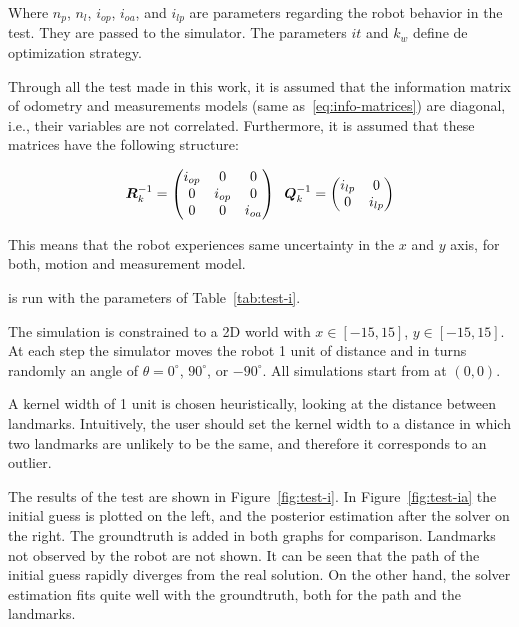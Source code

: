 Where $n_p$, $n_l$, $i_{op}$, $i_{oa}$, and $i_{lp}$ are parameters regarding the robot behavior in the test. They are passed to the simulator. The parameters $it$ and $k_w$ define de optimization strategy.

Through all the test made in this work, it is assumed that the information matrix of odometry and measurements models (same as~\eqref{eq:info-matrices}) are diagonal, i.e., their variables are not correlated. Furthermore, it is assumed that these matrices have the following structure:

\begin{equation}
\boldsymbol{R}^{-1}_k = \begin{pmatrix}
i_{op} & 0 & 0\\
0 & i_{op} & 0\\
0 & 0 & i_{oa}
\end{pmatrix} \;\;
\boldsymbol{Q}^{-1}_k = \begin{pmatrix}
i_{lp} & 0\\
0 & i_{lp}
\end{pmatrix} 
\label{eq:info-matrices-tests}
\end{equation}

This means that the robot experiences same uncertainty in the $x$ and $y$ axis, for both, motion and measurement model. 

 is run with the parameters of Table~\ref{tab:test-i}. 

The simulation is constrained to a 2D world with $x\in[-15,15]$, $y\in[-15,15]$. At each step the simulator moves the robot 1 unit of distance and in turns randomly an angle of $\theta=0^\circ$, $90^\circ$, or $-90^\circ$. All simulations start from at $(0,0)$.

A kernel width of 1 unit is chosen heuristically, looking at the distance between landmarks. Intuitively, the user should set the kernel width to a distance in which two landmarks are unlikely to be the same, and therefore it corresponds to an outlier.

The results of the test are shown in Figure~\ref{fig:test-i}. In Figure~\ref{fig:test-ia} the initial guess is plotted on the left, and the posterior estimation after the solver on the right. The groundtruth is added in both graphs for comparison. Landmarks not observed by the robot are not shown.  It can be seen that the path of the initial guess rapidly diverges from the real solution. On the other hand, the solver estimation fits quite well with the groundtruth, both for the path and the landmarks.

